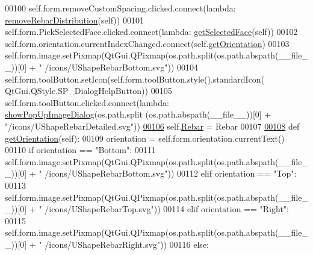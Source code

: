 \begin{DoxyCode}
00100         self.form.removeCustomSpacing.clicked.connect(\textcolor{keyword}{lambda}: 
      \hyperlink{namespaceRebarDistribution_a85270a1b6e8c782a9e0ba54add518f2a}{removeRebarDistribution}(self))
00101         self.form.PickSelectedFace.clicked.connect(\textcolor{keyword}{lambda}: \hyperlink{namespaceRebarfunc_a8c003df49ac5f249bd9ea4acfb7d2f8d}{getSelectedFace}(self))
00102         self.form.orientation.currentIndexChanged.connect(self.\hyperlink{classUShapeRebar_1_1__UShapeRebarTaskPanel_a3389799920a78686a2b4e17131101db0}{getOrientation})
00103         self.form.image.setPixmap(QtGui.QPixmap(os.path.split(os.path.abspath(\_\_file\_\_))[0] + \textcolor{stringliteral}{"
      /icons/UShapeRebarBottom.svg"}))
00104         self.form.toolButton.setIcon(self.form.toolButton.style().standardIcon(
      QtGui.QStyle.SP\_DialogHelpButton))
00105         self.form.toolButton.clicked.connect(\textcolor{keyword}{lambda}: \hyperlink{namespacePopUpImage_a8c565620d7de9b4882a44eacb870ad05}{showPopUpImageDialog}(os.path.split
      (os.path.abspath(\_\_file\_\_))[0] + \textcolor{stringliteral}{"/icons/UShapeRebarDetailed.svg"}))
\hypertarget{UShapeRebar_8py_source.tex_l00106}{}\hyperlink{classUShapeRebar_1_1__UShapeRebarTaskPanel_a01238597180da20c197d4c02925814f6}{00106}         self.\hyperlink{classUShapeRebar_1_1__UShapeRebarTaskPanel_a01238597180da20c197d4c02925814f6}{Rebar} = Rebar
00107 
\hypertarget{UShapeRebar_8py_source.tex_l00108}{}\hyperlink{classUShapeRebar_1_1__UShapeRebarTaskPanel_a3389799920a78686a2b4e17131101db0}{00108}     \textcolor{keyword}{def }\hyperlink{classUShapeRebar_1_1__UShapeRebarTaskPanel_a3389799920a78686a2b4e17131101db0}{getOrientation}(self):
00109         orientation = self.form.orientation.currentText()
00110         \textcolor{keywordflow}{if} orientation == \textcolor{stringliteral}{"Bottom"}:
00111             self.form.image.setPixmap(QtGui.QPixmap(os.path.split(os.path.abspath(\_\_file\_\_))[0] + \textcolor{stringliteral}{"
      /icons/UShapeRebarBottom.svg"}))
00112         \textcolor{keywordflow}{elif} orientation == \textcolor{stringliteral}{"Top"}:
00113             self.form.image.setPixmap(QtGui.QPixmap(os.path.split(os.path.abspath(\_\_file\_\_))[0] + \textcolor{stringliteral}{"
      /icons/UShapeRebarTop.svg"}))
00114         \textcolor{keywordflow}{elif} orientation == \textcolor{stringliteral}{"Right"}:
00115             self.form.image.setPixmap(QtGui.QPixmap(os.path.split(os.path.abspath(\_\_file\_\_))[0] + \textcolor{stringliteral}{"
      /icons/UShapeRebarRight.svg"}))
00116         \textcolor{keywordflow}{else}:

\end{DoxyCode}
